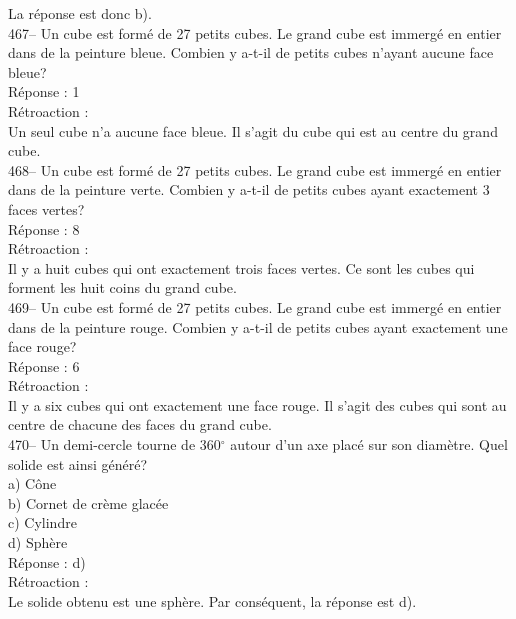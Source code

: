 ﻿\documentclass[letterpaper, 12pt]{article}
\begin{document}
La r\'eponse est donc b).\\

467-- Un cube est form\'e de 27 petits cubes.  Le grand cube est immerg\'e
en entier dans de la peinture bleue.  Combien y a-t-il de petits cubes
n'ayant aucune face bleue?\\

R\'eponse : 1\\

R\'etroaction : \\
Un seul cube n'a aucune face bleue.  Il s'agit du cube qui est au centre du
grand cube.\\

468-- Un cube est form\'e de 27 petits cubes.  Le grand cube est immerg\'e
en entier dans de la peinture verte.  Combien y a-t-il de petits cubes ayant
exactement 3 faces vertes?\\

R\'eponse : 8\\

R\'etroaction : \\
Il y a huit cubes qui ont exactement trois faces vertes.  Ce sont les
cubes qui forment les huit coins du grand cube. \\

469-- Un cube est form\'e de 27 petits cubes.  Le grand cube est immerg\'e
en entier dans de la peinture rouge.  Combien y a-t-il de petits cubes ayant
exactement une face rouge?\\

R\'eponse : 6\\

R\'etroaction : \\
Il y a six cubes qui ont exactement une face rouge.  Il s'agit des cubes qui
sont au centre de chacune des faces du grand cube.  \\


470-- Un demi-cercle tourne de 360$^{\circ}$ autour d'un axe plac\'e sur son
diam\`etre.  Quel solide est ainsi g\'en\'er\'e?\\
a) C\^one\\
b) Cornet de cr\`eme glac\'ee\\
c) Cylindre\\
d) Sph\`ere\\

R\'eponse : d)\\

R\'etroaction : \\
Le solide obtenu est une sph\`ere.  Par cons\'equent, la r\'eponse est d).\\
\end{document}
